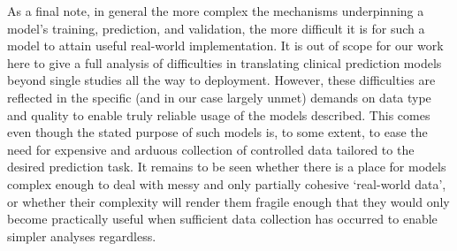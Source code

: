 \documentclass[../thesis.tex]{subfiles}
\begin{document}
As a final note, in general the more complex the mechanisms underpinning a model's training, prediction, and validation, the more difficult it is for such a model to attain useful real-world implementation. It is out of scope for our work here to give a full analysis of difficulties in translating clinical prediction models beyond single studies all the way to deployment. However, these difficulties are reflected in the specific (and in our case largely unmet) demands on data type and quality to enable truly reliable usage of the models described. This comes even though the stated purpose of such models is, to some extent, to ease the need for expensive and arduous collection of controlled data tailored to the desired prediction task. It remains to be seen whether there is a place for models complex enough to deal with messy and only partially cohesive `real-world data', or whether their complexity will render them fragile enough that they would only become practically useful when sufficient data collection has occurred to enable simpler analyses regardless.

\dobib %
\end{document}

